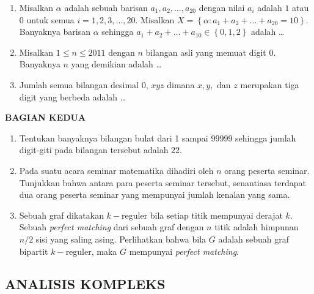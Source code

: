 \documentclass[12pt,twoside]{article}
\begin{document}
\begin{enumerate}
	\item Misalkan $\alpha $ adalah sebuah barisan $a_1, a_2,\dots , a_{20}$ dengan nilai $a_i$ adalah $1$ atau $0$ untuk semua $i = 1,2,3,\dots,20$. Misalkan $X = \left\lbrace \alpha : a_1 +a_2+\dots+a_{20} = 10 \right\rbrace$. Banyaknya barisan $\alpha$ sehingga $a_1 + a_2 +\dots+ a_{10} \in \left\lbrace 0,1,2 \right\rbrace$ adalah \dots

	\item Misalkan $1 \leq n \leq 2011 $ dengan $n $ bilangan asli yang memuat digit 0. Banyaknya $n$ yang demikian adalah \dots

	\item Jumlah semua bilangan desimal 0, $xyz$ dimana $x,y,$ dan $z$ merupakan tiga digit yang berbeda adalah \dots
\end{enumerate}

\newpage \textbf{BAGIAN KEDUA}
\begin{enumerate}
	\item Tentukan banyaknya bilangan bulat dari 1 sampai 99999 sehingga jumlah digit-giti pada bilangan tersebut adalah 22.

	\item Pada suatu acara seminar matematika dihadiri oleh $n$ orang peserta seminar. Tunjukkan bahwa antara para peserta seminar tersebut, senantiasa terdapat dua orang peserta seminar yang mempunyai jumlah kenalan yang sama.

	\item Sebuah graf dikatakan $k-$reguler bila setiap titik mempunyai derajat $k$. Sebuah \textit{perfect matching} dari sebuah graf dengan $n$ titik adalah himpunan $n/2$ sisi yang saling asing. Perlihatkan bahwa bila $G$ adalah sebuah graf bipartit $k-$reguler, maka $G$ mempunyai \textit{perfect matching}.
\end{enumerate}

\newpage \subsection{ANALISIS KOMPLEKS}
\end{document}
